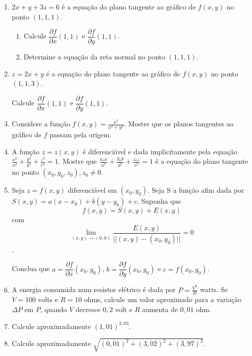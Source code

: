 \documentclass[11pt,a4paper]{article}
\newcommand{\limite}{\displaystyle\lim}
\begin{document}
\begin{enumerate}
	\item $2x + y + 3z = 6$ é a equação do plano tangente ao gráfico de $f(x,y)$ no ponto $(1,1,1)$.
	
	\begin{enumerate}
		\item Calcule $\dfrac{\partial f}{\partial x}(1,1)$ e $\dfrac{\partial f}{\partial y}(1,1)$.
		\item Determine a equação da reta normal no ponto $(1,1,1)$.
	\end{enumerate}
	
	\item $z = 2x + y$ é a equação do plano tangente ao gráfico de $f(x,y)$ no ponto $(1,1,3)$. 
	
	Calcule $\dfrac{\partial f}{\partial x}(1,1)$ e $\dfrac{\partial f}{\partial y}(1,1)$.
	
	\item Considere a função $f(x,y) = \displaystyle\frac{x^3}{x^2 + y^2}$. Mostre que os planos tangentes ao gráfico de $f$ passam pela origem.
	
	\item A função $z = z(x,y)$ é diferenciável e dada implicitamente pela equação $\displaystyle\frac{x^2}{a^2} + \displaystyle\frac{y^2}{b^2} + \displaystyle\frac{z^2}{c^2} = 1$. Mostre que $\displaystyle\frac{x_0x}{a^2} + \displaystyle\frac{y_0y}{b^2} + \displaystyle\frac{z_0z}{c^2} = 1$ é a equação do plano tangente no ponto $(x_0, y_0, z_0), z_0 \neq 0$.  
	
	\item Seja $z = f(x,y)$ diferenciável em $(x_0,y_0)$. Seja S a função afim dada por $S(x,y) = a(x - x_0) + b(y - y_0) + c.$ Suponha que
	$$f(x,y) = S(x,y) + E(x,y)$$
com
	$$\limite_{(x,y) \to (0,0)} \displaystyle\frac{E(x,y)}{||(x,y) - (x_0, y_0)||} = 0$$.
	
	Conclua que $a = \dfrac{\partial f}{\partial x}(x_0,y_0)$, $b = \dfrac{\partial f}{\partial y}(x_0,y_0)$ e $c = f(x_0, y_0)$.
	
	\item A energia consumida num resistor elétrico é dada por $P = \displaystyle\frac{V^2}{R}$ watts. Se $V = 100$ volts e $R = 10$ ohms, calcule um valor aproximado para a variação $\Delta P$ em $P$, quando $V$ decresce $0,2$ volt e $R$ aumenta de $0,01$ ohm.
	
	\item Calcule aproximadamente $(1,01)^{2,03}$.
	
	\item Calcule aproximadamente $\sqrt{(0,01)^2 + (3,02)^2 + (3,97)^2}$.	
	

\end{enumerate}
\end{document}
